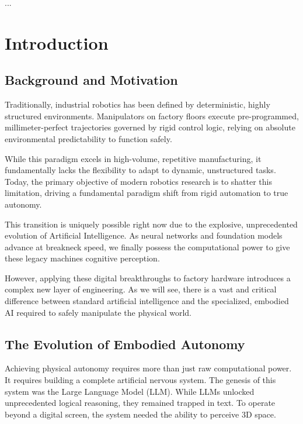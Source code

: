 \documentclass[a4paper, 12pt, twoside, openright]{book}
\newenvironment{abstract}{\cleardoublepage \null \vfill \begin{center}\bfseries\abstractname \end{center}}{\vfill\null}
\begin{document}
\begin{abstract} %
\markboth{}{} %
\thispagestyle{empty}
...
\end{abstract}


\mainmatter\doublespace 

\chapter{Introduction} %
\thispagestyle{empty}

\section{Background and Motivation}

Traditionally, industrial robotics has been defined by deterministic, highly structured environments. Manipulators on factory floors execute pre-programmed, millimeter-perfect trajectories governed by rigid control logic, relying on absolute environmental predictability to function safely. 

While this paradigm excels in high-volume, repetitive manufacturing, it fundamentally lacks the flexibility to adapt to dynamic, unstructured tasks. Today, the primary objective of modern robotics research is to shatter this limitation, driving a fundamental paradigm shift from rigid automation to true autonomy.

This transition is uniquely possible right now due to the explosive, unprecedented evolution of Artificial Intelligence. As neural networks and foundation models advance at breakneck speed, we finally possess the computational power to give these legacy machines cognitive perception.

However, applying these digital breakthroughs to factory hardware introduces a complex new layer of engineering. As we will see, there is a vast and critical difference between standard artificial intelligence and the specialized, embodied AI required to safely manipulate the physical world.




\section{The Evolution of Embodied Autonomy}
Achieving physical autonomy requires more than just raw computational power. It requires building a complete artificial nervous system. The genesis of this system was the Large Language Model (LLM). While LLMs unlocked unprecedented logical reasoning, they remained trapped in text. To operate beyond a digital screen, the system needed the ability to perceive 3D space.
\end{document}
